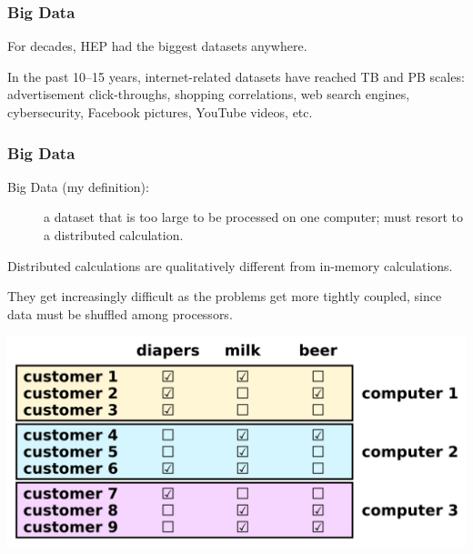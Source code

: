 \documentclass[compress]{beamer}
\begin{document}
\begin{frame}
\frametitle{Big Data}

For decades, HEP had the biggest datasets anywhere.

\vfill
In the past 10--15 years, internet-related datasets have reached TB and PB scales: advertisement click-throughs, shopping correlations, web search engines, cybersecurity, Facebook pictures, YouTube videos, etc.

\vfill
{}

\vfill
{}
\end{frame}

\begin{frame}
\frametitle{Big Data}

\begin{description}
\item[Big Data (my definition):] a dataset that is too large to be processed on one computer; must resort to a distributed calculation.
\end{description}

\vspace{0.2 cm}
Distributed calculations are qualitatively different from in-memory calculations.

\vspace{0.2 cm}
They get increasingly difficult as the problems get more tightly coupled, since data must be shuffled among processors.

\begin{center}
\includegraphics[width=0.8\linewidth]{PLOTS/distributed_data.png}
\end{center}
\end{frame}
\end{document}
